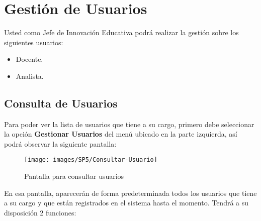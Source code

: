 
\chapter{Gestión de Usuarios}
    
    Usted como Jefe de Innovación Educativa podrá realizar la gestión sobre los siguientes usuarios:
    \begin{itemize}
        \item Docente.
        \item Analista.
    \end{itemize}
    

    \section{Consulta de Usuarios}
        
        Para poder ver la lista de usuarios que tiene a su cargo, primero debe seleccionar la opción \textbf{Gestionar Usuarios} del menú ubicado en la parte izquierda, así podrá observar la siguiente pantalla:
        
        \begin{figure}[!hbtp]
            \centering
            \hypertarget{consultarUs}{\texttt{[image: images/SP5/Consultar-Usuario]}}
            \caption{Pantalla para consultar usuarios}
            \label{consultarrh}
        \end{figure}
        
        En esa pantalla, aparecerán de forma predeterminada todos los usuarios que tiene a su cargo y que están registrados en el sistema hasta el momento. Tendrá a su disposición 2 funciones:
        

